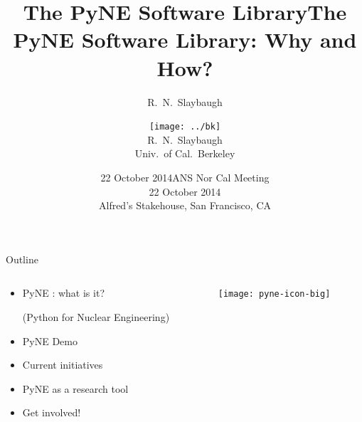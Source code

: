 \documentclass[xcolor=x11names,compress]{beamer}
\title{The PyNE Software Library}
\author{R.\ N.\ Slaybaugh}
\date{22 October 2014}
\renewcommand{\(}{\begin{columns}}
\renewcommand{\)}{\end{columns}}
\newcommand{\<}[1]{\begin{column}{#1}}
\renewcommand{\>}{\end{column}}
\begin{document}
\begin{frame}
\title{The PyNE Software Library: Why and How?}
\author{
        \texttt{[image: ../bk]}\\R.\ N.\ Slaybaugh \\ Univ.\ of Cal.\ Berkeley}

\date{ANS Nor Cal Meeting \\ 22 October 2014\\ Alfred's Stakehouse, San Francisco, CA}
\titlepage
\end{frame}

\begin{frame}{Outline}

	\begin{columns}
  	\begin{column}{0.5\textwidth}
	    \begin{itemize}
        \item PyNE \cite{pyne}: what is it?
        
        (Python for Nuclear Engineering)
        \item PyNE Demo
        \item Current initiatives
        \item PyNE as a research tool
        \item Get involved!
	    \end{itemize}
  	\end{column}
 	\begin{column}{0.4\textwidth}
 	   \begin{center}
 	   \begin{figure}
       \texttt{[image: pyne-icon-big]}
	   \end{figure}
 	   \end{center}
  	\end{column}
	\end{columns}

\end{frame}

\end{document}
